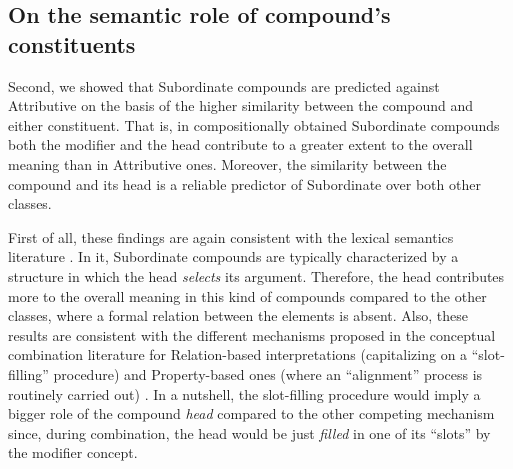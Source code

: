 \documentclass[output=paper]{langsci/langscibook}
\begin{document}
\subsection{On the semantic role of compound's constituents}

Second, we showed that Subordinate compounds are predicted against Attributive on the basis of the higher similarity between the compound and either constituent. That is, in compositionally obtained Subordinate compounds both the modifier and the head contribute to a greater extent to the overall meaning than in Attributive ones. Moreover, the similarity between the compound and its head is a reliable predictor of Subordinate over both other classes.

First of all, these findings are again consistent with the lexical semantics literature \citep{sbg2005,lieber5OHC}. In it, Subordinate compounds are typically characterized by a structure in which the head \emph{selects} its argument. Therefore, the head contributes more to the overall meaning in this kind of compounds compared to the other classes, where a formal relation between the elements is absent. Also, these results are consistent with the different mechanisms proposed in the conceptual combination literature for Relation-based interpretations (capitalizing on a ``slot-filling'' procedure) and Property-based ones (where an ``alignment'' process is routinely carried out) \citep{wisniewskigentner,wisniewski1996}. In a nutshell, the slot-filling procedure would imply a bigger role of the compound \emph{head} compared to the other competing mechanism since, during combination, the head would be just \emph{filled} in one of its ``slots'' by the modifier concept.
\end{document}
